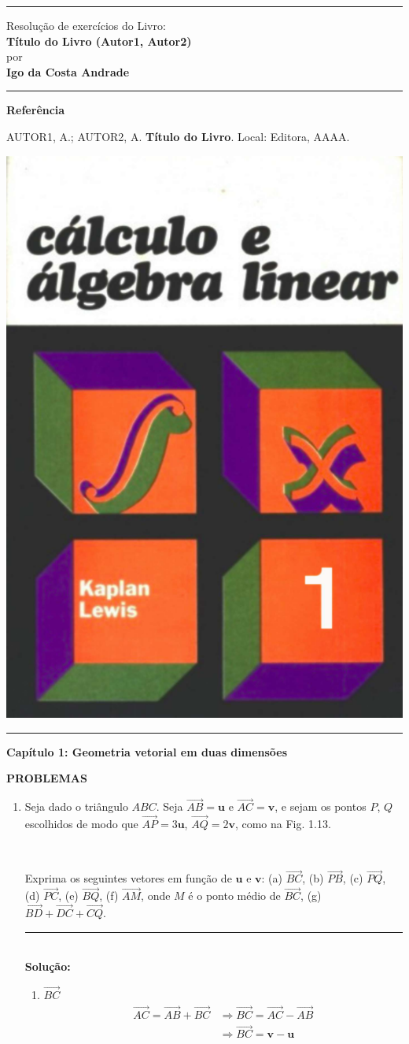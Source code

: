 \documentclass[twoside]{article}\usepackage[]{graphicx}\usepackage[]{xcolor}
\newcommand{\capitulo}{1}
\newcommand{\makecover}{
    \textcolor{mainColor}{\hrule}
    \vspace{0.25cm}
    \begin{minipage}[c]{12cm}
        \begin{center}
            \Large{
                Resolução de exercícios do Livro:\\
                \vspace{0.25cm}
                \textcolor{mainColor}{\textbf{Título do Livro (Autor1, Autor2)}}\\
                \vspace{0.7cm}
                \small{por}\\
                \vspace{0.2cm}
                \textbf{\large{Igo da Costa Andrade}}
            }
        \end{center}
        \vspace{0.25cm}
        \hrule
        \vspace{0.25cm}
        \textbf{Referência}
        
        \noindent AUTOR1, A.; AUTOR2, A. \textbf{Título do Livro}. Local: Editora, AAAA.
    \end{minipage}
    \begin{minipage}[c]{4cm}
    
        \begin{flushright}
            \includegraphics[width=0.8\linewidth]{img/capa.png}    
        \end{flushright}
        
    \end{minipage}
    \vspace{0.25cm}
    \textcolor{mainColor}{\hrule}
    
}
\newcommand{\iniSol}{
    \noindent\textcolor{mainColor}{\rule{0.3\textwidth}{0.4pt}}\\
    \noindent\textcolor{mainColor}{\textbf{Solução:}}\\
}
\begin{document}
\thispagestyle{empty}

\makecover{}


\begin{center}
    \vspace{1cm}
    \textbf{\Large{\textcolor{mainColor}{Capítulo \capitulo:} Geometria vetorial em duas dimensões}}
    \vspace{1cm}

    \textbf{PROBLEMAS}
\end{center}

\begin{enumerate}
    \item Seja dado o triângulo $ABC$. Seja $\overrightarrow{AB} = \mathbf{u}$ e $\overrightarrow{AC} = \mathbf{v}$, e sejam os pontos $P$, $Q$ escolhidos de modo que $\overrightarrow{AP} = 3\mathbf{u}$, $\overrightarrow{AQ} = 2 \mathbf{v}$, como na Fig. 1.13. 


    \begin{figure}[H]
        \centering
        \\
    \end{figure}
    
    Exprima os seguintes vetores em função de $\mathbf{u}$ e $\mathbf{v}$: (a) $\overrightarrow{BC}$, (b) $\overrightarrow{PB}$, (c) $\overrightarrow{PQ}$, (d) $\overrightarrow{PC}$, (e) $\overrightarrow{BQ}$, (f) $\overrightarrow{AM}$, onde $M$ é o ponto médio de $\overrightarrow{BC}$, (g) $\overrightarrow{BD} + \overrightarrow{DC} + \overrightarrow{CQ}$.

    \iniSol
    
    \begin{enumerate}[label=(\alph*)]
        \item $\overrightarrow{BC}$
        \begin{align*}
            \overrightarrow{AC} = \overrightarrow{AB} + \overrightarrow{BC} &\Rightarrow \overrightarrow{BC} = \overrightarrow{AC} - \overrightarrow{AB}\\
            &\Rightarrow \overrightarrow{BC} = \mathbf{v} - \mathbf{u}
        \end{align*}
        

\end{enumerate}
\end{enumerate}
\end{document}
